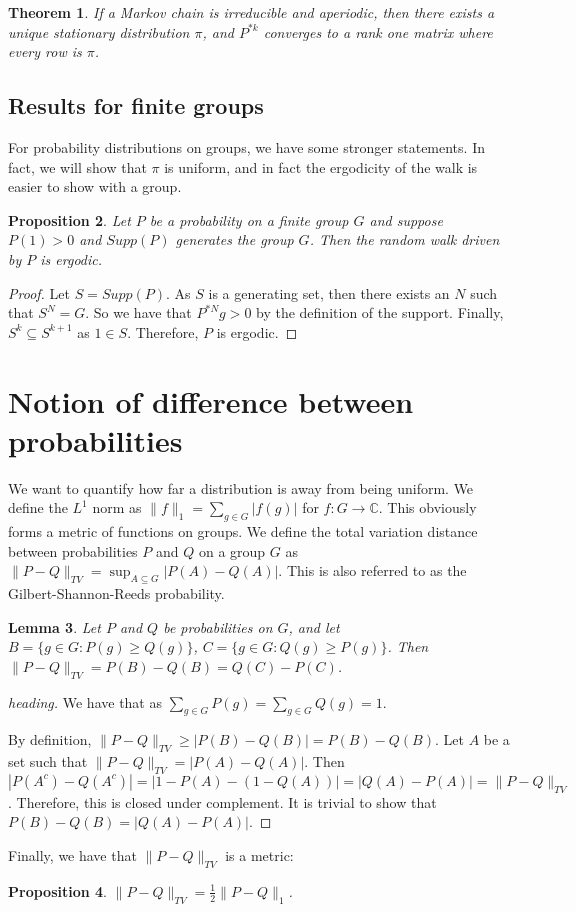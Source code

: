 \documentclass[]{article}
\newtheorem{theorem}{Theorem}
\newtheorem{proposition}[theorem]{Proposition}
\newtheorem{lemma}[theorem]{Lemma}
\theoremstyle{definition}
\numberwithin{theorem}{section}
\numberwithin{equation}{section}
\begin{document}
\begin{theorem}
	If a Markov chain is irreducible and aperiodic, then there exists a unique stationary distribution $\pi$, and $P^{*k}$ converges to a rank one matrix where every row is $\pi$. 
\end{theorem}


\subsection{Results for finite groups}
For probability distributions on groups, we have some stronger statements. In fact, we will show that $\pi$ is uniform, and in fact the ergodicity of the walk is easier to show with a group. 
\begin{proposition}
	Let $P$ be a probability on a finite group $G$ and suppose $P(1) > 0$ and $Supp(P)$ generates the group $G$. Then the random walk driven by $P$ is ergodic.
\end{proposition}

\begin{proof}
	Let $S = Supp(P)$. As $S$ is a generating set, then there exists an $N$ such that $S^N = G$. So we have that $P^{\ast N} g > 0$ by the definition of the support. Finally, $S^{k} \subseteq S^{k + 1}$ as $1 \in S$. Therefore, $P$ is ergodic. 
\end{proof}

\section{Notion of difference between probabilities}
We want to quantify how far a distribution is away from being uniform. We define the $L^1$ norm as $\|f\|_1 = \sum_{g \in G} |f(g)|$ for $f : G \rightarrow \mathbb{C}$. This obviously forms a metric of functions on groups. 
We define the total variation distance between probabilities $P$ and $Q$ on a group $G$ as $\| P - Q\|_{TV} = \sup_{A \subseteq G} |P(A) - Q(A)|$. This is also referred to as the Gilbert-Shannon-Reeds probability. 

\begin{lemma}
	Let $P$ and $Q$ be probabilities on $G$, and let $B = \lbrace g \in G : P(g) \geq Q(g) \rbrace$, $C = \lbrace g \in G : Q(g) \geq P(g) \rbrace$.
	Then $\|P - Q \|_{TV} = P(B) - Q(B) = Q(C) - P(C)$.
\end{lemma}
\begin{proof}[heading]
	We have that as $\sum_{g \in G} P(g) = \sum_{g \in G} Q(g) = 1$. 
	
	
	By definition, $\|P - Q\|_{TV} \geq |P(B) - Q(B)| = P(B) - Q(B)$.
	Let $A$ be a set such that $\|P - Q\|_{TV} = |P(A) - Q(A)|.$ Then $|P(A^c) - Q(A^c)| = |1 - P(A) - (1 - Q(A))| = |Q(A) - P(A)| = \|P - Q \|_{TV}$. Therefore, this is closed under complement. It is trivial to show that $P(B) - Q(B) = |Q(A) - P(A)|$. 
\end{proof}
Finally, we have that $\|P - Q \|_{TV}$ is a metric:
\begin{proposition}
	\label{prop:distribution difference equality}
	$\|P - Q\|_{TV} = \frac{1}{2} \|P - Q \|_1$. 
\end{proposition}
\end{document}
